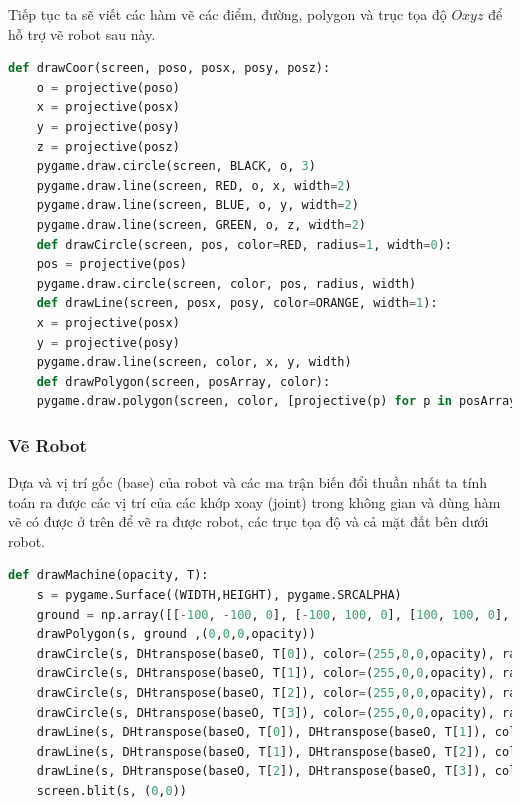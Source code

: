 Tiếp tục ta sẽ viết các hàm vẽ các điểm, đường, polygon và trục tọa độ $Oxyz$ để hỗ trợ vẽ robot sau này.

\vspace{0.5cm}
\begin{lstlisting}[language=python]
	def drawCoor(screen, poso, posx, posy, posz):
	o = projective(poso)
	x = projective(posx)
	y = projective(posy)
	z = projective(posz)
	pygame.draw.circle(screen, BLACK, o, 3)
	pygame.draw.line(screen, RED, o, x, width=2)
	pygame.draw.line(screen, BLUE, o, y, width=2)
	pygame.draw.line(screen, GREEN, o, z, width=2)
	def drawCircle(screen, pos, color=RED, radius=1, width=0):
	pos = projective(pos)
	pygame.draw.circle(screen, color, pos, radius, width)
	def drawLine(screen, posx, posy, color=ORANGE, width=1):
	x = projective(posx)
	y = projective(posy)
	pygame.draw.line(screen, color, x, y, width)
	def drawPolygon(screen, posArray, color):
	pygame.draw.polygon(screen, color, [projective(p) for p in posArray], 0)
\end{lstlisting}

\subsubsection{Vẽ Robot}

Dựa và vị trí gốc (base) của robot và các ma trận biến đổi thuần nhất ta tính toán ra được các vị trí của các khớp xoay (joint) trong không gian và dùng hàm vẽ có được ở trên để vẽ ra được robot, các trục tọa độ và cả mặt đất bên dưới robot.

\vspace{0.5cm}
\begin{lstlisting}[language=python]
	def drawMachine(opacity, T):
	s = pygame.Surface((WIDTH,HEIGHT), pygame.SRCALPHA)
	ground = np.array([[-100, -100, 0], [-100, 100, 0], [100, 100, 0], [100, -100, 0]])
	drawPolygon(s, ground ,(0,0,0,opacity))     
	drawCircle(s, DHtranspose(baseO, T[0]), color=(255,0,0,opacity), radius=5)
	drawCircle(s, DHtranspose(baseO, T[1]), color=(255,0,0,opacity), radius=5)
	drawCircle(s, DHtranspose(baseO, T[2]), color=(255,0,0,opacity), radius=5)
	drawCircle(s, DHtranspose(baseO, T[3]), color=(255,0,0,opacity), radius=5)
	drawLine(s, DHtranspose(baseO, T[0]), DHtranspose(baseO, T[1]), color=(230,0,180,opacity), width=5)
	drawLine(s, DHtranspose(baseO, T[1]), DHtranspose(baseO, T[2]), color=(230,0,180,opacity), width=5)
	drawLine(s, DHtranspose(baseO, T[2]), DHtranspose(baseO, T[3]), color=(230,0,180,opacity), width=5)
	screen.blit(s, (0,0))
\end{lstlisting}

